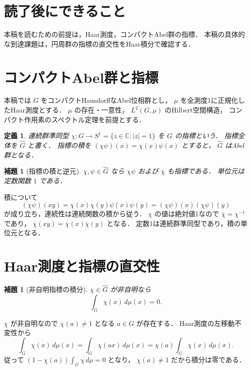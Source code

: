 \documentclass[a5paper,10pt,onecolumn]{jsarticle}
\makeatletter
\theoremstyle{mathnotetheorem}
\newtheorem{definition}[theorem]{定義}
\newtheorem{lemma}[theorem]{補題}
\renewcommand{\proofname}{証明}
\renewenvironment{proof}[1][\proofname]{%
  \par\pushQED{\qed}\normalfont\topsep4\p@\@plus2\p@\relax
  \trivlist\item[\hskip\labelsep\bfseries #1]\ignorespaces
}{\popQED\endtrivlist\@endpefalse}
\makeatother
\begin{document}
\section*{読了後にできること}
本稿を読むための前提は，Haar測度，コンパクトAbel群の指標．
本稿の具体的な到達課題は，円周群の指標の直交性をHaar積分で確認する．

\section{コンパクトAbel群と指標}

本稿では $G$ をコンパクトHausdorffなAbel位相群とし，
$\mu$ を全測度1に正規化したHaar測度とする．
$\mu$ の存在・一意性，
$L^2(G,\mu)$ のHilbert空間構造，
コンパクト作用素のスペクトル定理を前提とする．

\begin{definition}
連続群準同型
$\chi:G\to S^1=\{z\in\mathbb C:|z|=1\}$
を $G$ の\emph{指標}という．
指標全体を $\widehat G$ と書く．
指標の積を
$(\chi\psi)(x)=\chi(x)\psi(x)$ とすると，
$\widehat G$ はAbel群となる．
\end{definition}

\begin{lemma}[指標の積と逆元]\label{lem:character-group}
$\chi,\psi\in\widehat G$ なら
$\chi\psi$ および $\overline\chi$ も指標である．
単位元は定数関数 $1$ である．
\end{lemma}
\begin{proof}
積について
\[
 (\chi\psi)(xy)
 =\chi(x)\chi(y)\psi(x)\psi(y)
 =(\chi\psi)(x)(\chi\psi)(y)
\]
が成り立ち，連続性は連続関数の積から従う．
$\chi$ の値は絶対値1なので
$\overline\chi=\chi^{-1}$ であり，
$\overline\chi(xy)=\overline\chi(x)\overline\chi(y)$ となる．
定数1は連続群準同型であり，積の単位元となる．
\end{proof}

\section{Haar測度と指標の直交性}

\begin{lemma}[非自明指標の積分]\label{lem:char-integral}
$\chi\in\widehat G$ が非自明なら
\[
 \int_G\chi(x)\,d\mu(x)=0.
\]
\end{lemma}
\begin{proof}
$\chi$ が非自明なので
$\chi(a)\ne1$ となる $a\in G$ が存在する．
Haar測度の左移動不変性から
\[
 \int_G\chi(x)\,d\mu(x)
 =\int_G\chi(ax)\,d\mu(x)
 =\chi(a)\int_G\chi(x)\,d\mu(x).
\]
従って $(1-\chi(a))\int_G\chi\,d\mu=0$ となり，
$\chi(a)\ne1$ だから積分は零である．
\end{proof}
\end{document}
